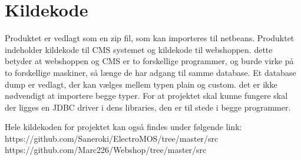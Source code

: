 \chapter{Kildekode}

Produktet er vedlagt som en zip fil, som kan importeres til netbeans. Produktet indeholder kildekode til CMS systemet og kildekode til webshoppen. dette betyder at webshoppen og CMS er to forskellige programmer, og burde virke på to forskellige maskiner, så længe de har adgang til samme database.
Et database dump er vedlagt, der kan vælges mellem typen plain og custom. det er ikke nødvendigt at importere begge typer. For at projektet skal kunne fungere skal der ligges en JDBC driver i dens libraries, den er til stede i begge programmer.

Hele kildekoden for projektet kan også findes under følgende link: \\

\noindent https://github.com/Saneroki/ElectroMOS/tree/master/src
\noindent https://github.com/Marc226/Webshop/tree/master/src